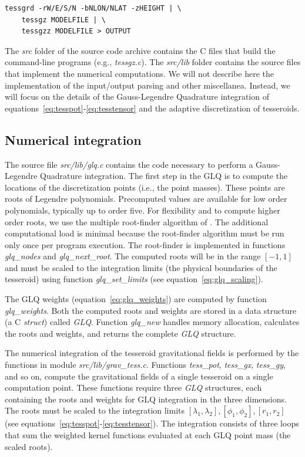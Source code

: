 \documentclass[paper,twocolumn,twoside]{geophysics}
\begin{document}
\begin{verbatim}
tessgrd -rW/E/S/N -bNLON/NLAT -zHEIGHT | \
    tessgz MODELFILE | \
    tessgzz MODELFILE > OUTPUT
\end{verbatim}

The \emph{src} folder of the source code archive
contains the C files that build the command-line programs
(e.g., \emph{tessgz.c}).
The \emph{src/lib} folder contains
the source files that implement the numerical computations.
We will not describe here the implementation of the input/output parsing and
other miscellanea.
Instead, we will focus on the details of the Gauss-Legendre Quadrature
integration of equations~\ref{eq:tesspot}-\ref{eq:tesstensor}
and the adaptive discretization of tesseroids.



\subsection{Numerical integration}

The source file \emph{src/lib/glq.c}
contains the code necessary to perform
a Gauss-Legendre Quadrature integration.
The first step in the GLQ is to compute the
locations of the discretization points (i.e., the point masses).
These points are roots of Legendre polynomials.
Precomputed values are available for low order polynomials,
typically up to order five.
For flexibility and to compute higher order roots,
we use the multiple root-finder algorithm of
\citet{Barrera-Figueroa2006}.
The additional computational load is minimal
because the root-finder algorithm
must be run only once per program execution.
The root-finder is implemented in functions
\emph{glq\_nodes} and \emph{glq\_next\_root}.
The computed roots will be in the range $[-1, 1]$
and must be scaled to the integration limits
(the physical boundaries of the tesseroid)
using function \emph{glq\_set\_limits} (see equation~\ref{eq:glq_scaling}).

The GLQ weights (equation~\ref{eq:glq_weights})
are computed by function \emph{glq\_weights}.
Both the computed roots and weights are stored in a data structure
(a C \emph{struct}) called \emph{GLQ}.
Function \emph{glq\_new}
handles memory allocation,
calculates the roots and weights,
and returns the complete \emph{GLQ} structure.

The numerical integration of the tesseroid gravitational fields
is performed by the functions in module \emph{src/lib/grav\_tess.c}.
Functions \emph{tess\_pot}, \emph{tess\_gx}, \emph{tess\_gy}, and so on,
compute the gravitational fields of a single tesseroid
on a single computation point.
These functions require three \emph{GLQ} structures,
each containing the roots and weights
for GLQ integration in the three dimensions.
The roots must be scaled to the
integration limits
$[\lambda_1, \lambda_2], [\phi_1, \phi_2], [r_1, r_2]$
(see equations~\ref{eq:tesspot}-\ref{eq:tesstensor}).
The integration consists of three loops
that sum the weighted kernel functions
evaluated at each GLQ point mass (the scaled roots).
\end{document}
